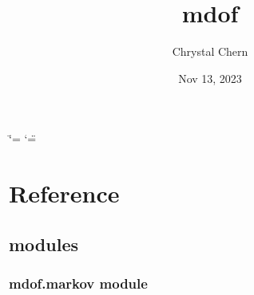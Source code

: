 \documentclass[letterpaper,10pt,english]{sphinxmanual}
\title{mdof}
\date{Nov 13, 2023}
\author{Chrystal Chern}
\begin{document}
\ifdefined\shorthandoff
  \ifnum\catcode`\=\string=\active\shorthandoff{=}\fi
  \ifnum\catcode`\"=\active{}\fi
\fi

\pagestyle{empty}
\sphinxmaketitle
\pagestyle{plain}
\sphinxtableofcontents
\pagestyle{normal}
\label{\detokenize{index::doc}}


\sphinxstepscope


\chapter{Reference}
\label{\detokenize{library/index:reference}}\label{\detokenize{library/index::doc}}

\section{modules}
\label{\detokenize{library/index:modules}}
\sphinxstepscope


\subsection{mdof.markov module}
\label{\detokenize{library/mdof.markov:module-mdof.markov}}\label{\detokenize{library/mdof.markov:mdof-markov-module}}\label{\detokenize{library/mdof.markov::doc}}
\end{document}
